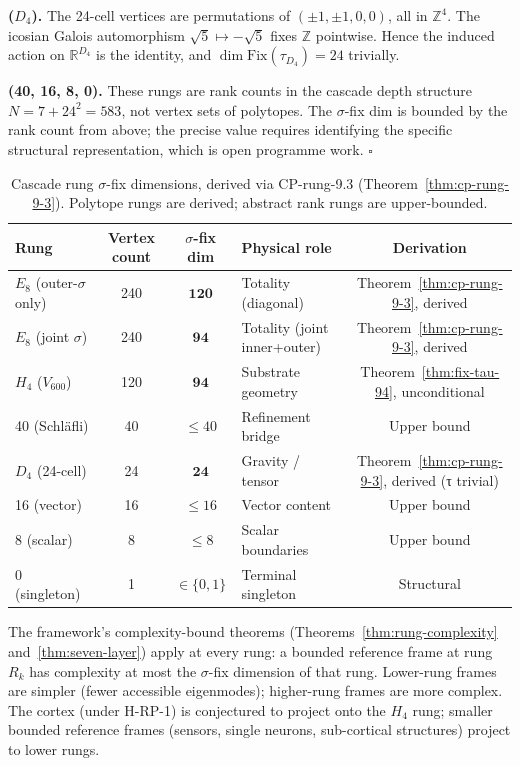 \documentclass[11pt]{article}
\theoremstyle{plain}
\theoremstyle{definition}
\theoremstyle{remark}
\newcommand{\Fix}{\mathrm{Fix}}
\begin{document}
\textbf{($D_4$).} The 24-cell vertices are permutations of $(\pm 1, \pm 1, 0, 0)$, all in $\mathbb{Z}^4$. The icosian Galois automorphism $\sqrt 5 \mapsto -\sqrt 5$ fixes $\mathbb{Z}$ pointwise. Hence the induced action on $\mathbb{R}^{D_4}$ is the identity, and $\dim \Fix(\tau_{D_4}) = 24$ trivially.

\textbf{(40, 16, 8, 0).} These rungs are rank counts in the cascade depth structure $N = 7 + 24^2 = 583$, not vertex sets of polytopes. The $\sigma$-fix dim is bounded by the rank count from above; the precise value requires identifying the specific structural representation, which is open programme work. \hfill$\square$

\begin{table}[h]
\centering
\small
\caption{Cascade rung $\sigma$-fix dimensions, derived via CP-rung-9.3 (Theorem~\ref{thm:cp-rung-9-3}). Polytope rungs are derived; abstract rank rungs are upper-bounded.}\label{tab:rung-sigma-fix}
\begin{tabular}{lcclc}
\toprule
Rung & Vertex count & $\sigma$-fix dim & Physical role & Derivation \\
\midrule
$E_8$ (outer-$\sigma$ only) & 240 & $\mathbf{120}$ & Totality (diagonal) & Theorem~\ref{thm:cp-rung-9-3}, derived \\
$E_8$ (joint $\sigma$) & 240 & $\mathbf{94}$ & Totality (joint inner+outer) & Theorem~\ref{thm:cp-rung-9-3}, derived \\
$H_4$ ($V_{600}$) & 120 & $\mathbf{94}$ & Substrate geometry & Theorem~\ref{thm:fix-tau-94}, unconditional \\
40 (Schläfli) & 40 & $\leq 40$ & Refinement bridge & Upper bound \\
$D_4$ (24-cell) & 24 & $\mathbf{24}$ & Gravity / tensor & Theorem~\ref{thm:cp-rung-9-3}, derived (τ trivial) \\
16 (vector) & 16 & $\leq 16$ & Vector content & Upper bound \\
8 (scalar) & 8 & $\leq 8$ & Scalar boundaries & Upper bound \\
0 (singleton) & 1 & $\in \{0, 1\}$ & Terminal singleton & Structural \\
\bottomrule
\end{tabular}
\end{table}

The framework's complexity-bound theorems (Theorems~\ref{thm:rung-complexity} and~\ref{thm:seven-layer}) apply at every rung: a bounded reference frame at rung $R_k$ has complexity at most the $\sigma$-fix dimension of that rung. Lower-rung frames are simpler (fewer accessible eigenmodes); higher-rung frames are more complex. The cortex (under H-RP-1) is conjectured to project onto the $H_4$ rung; smaller bounded reference frames (sensors, single neurons, sub-cortical structures) project to lower rungs.
\end{document}
